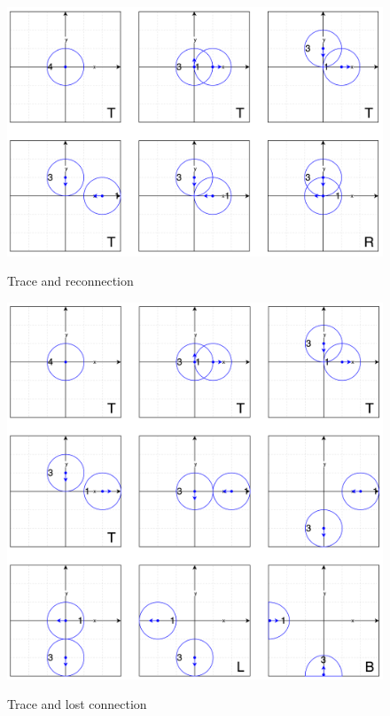 \begin{figure}[H]
\caption{Trace and reconnection}
\includegraphics[width=\textwidth]{images/reconnection.png}
\label{fig:reconnection}
\end{figure}

\begin{figure}[H]
\caption{Trace and lost connection}
\includegraphics[width=\textwidth]{images/lost_connection.png}
\label{fig:lost_connection}
\end{figure}


